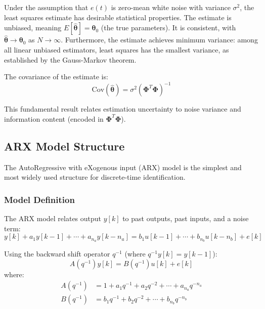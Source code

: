 Under the assumption that $e(t)$ is zero-mean white noise with variance $\sigma^2$, the least squares estimate has desirable statistical properties. The estimate is unbiased, meaning $E[\hat{\boldsymbol{\theta}}] = \boldsymbol{\theta}_0$ (the true parameters). It is consistent, with $\hat{\boldsymbol{\theta}} \to \boldsymbol{\theta}_0$ as $N \to \infty$. Furthermore, the estimate achieves minimum variance: among all linear unbiased estimators, least squares has the smallest variance, as established by the Gauss-Markov theorem.

The covariance of the estimate is:
\begin{equation}
\text{Cov}(\hat{\boldsymbol{\theta}}) = \sigma^2 \left(\boldsymbol{\Phi}^T\boldsymbol{\Phi}\right)^{-1}
\label{eq:param_covariance}
\end{equation}

This fundamental result relates estimation uncertainty to noise variance and information content (encoded in $\boldsymbol{\Phi}^T\boldsymbol{\Phi}$).

\subsection{ARX Model Structure}
\label{subsec:arx}

The AutoRegressive with eXogenous input (ARX) model is the simplest and most widely used structure for discrete-time identification.

\subsubsection{Model Definition}

The ARX model relates output $y[k]$ to past outputs, past inputs, and a noise term:
\begin{equation}
y[k] + a_1 y[k-1] + \cdots + a_{n_a} y[k-n_a] = b_1 u[k-1] + \cdots + b_{n_b} u[k-n_b] + e[k]
\label{eq:arx_time}
\end{equation}

Using the backward shift operator $q^{-1}$ (where $q^{-1}y[k] = y[k-1]$):
\begin{equation}
A(q^{-1}) y[k] = B(q^{-1}) u[k] + e[k]
\label{eq:arx_operator}
\end{equation}
where:
\begin{align}
A(q^{-1}) &= 1 + a_1 q^{-1} + a_2 q^{-2} + \cdots + a_{n_a} q^{-n_a} \\
B(q^{-1}) &= b_1 q^{-1} + b_2 q^{-2} + \cdots + b_{n_b} q^{-n_b}
\end{align}


